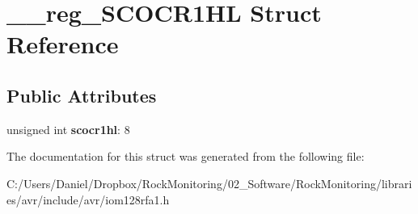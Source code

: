 \hypertarget{struct____reg___s_c_o_c_r1_h_l}{}\section{\+\_\+\+\_\+reg\+\_\+\+S\+C\+O\+C\+R1\+HL Struct Reference}
\label{struct____reg___s_c_o_c_r1_h_l}
\subsection*{Public Attributes}
\begin{DoxyCompactItemize}
\item 
unsigned int {\bfseries scocr1hl}\+: 8\hypertarget{struct____reg___s_c_o_c_r1_h_l_a221d5b2aab46d3e58d974c69a0bd6a36}{}\label{struct____reg___s_c_o_c_r1_h_l_a221d5b2aab46d3e58d974c69a0bd6a36}

\end{DoxyCompactItemize}


The documentation for this struct was generated from the following file\+:\begin{DoxyCompactItemize}
\item 
C\+:/\+Users/\+Daniel/\+Dropbox/\+Rock\+Monitoring/02\+\_\+\+Software/\+Rock\+Monitoring/libraries/avr/include/avr/iom128rfa1.\+h\end{DoxyCompactItemize}
